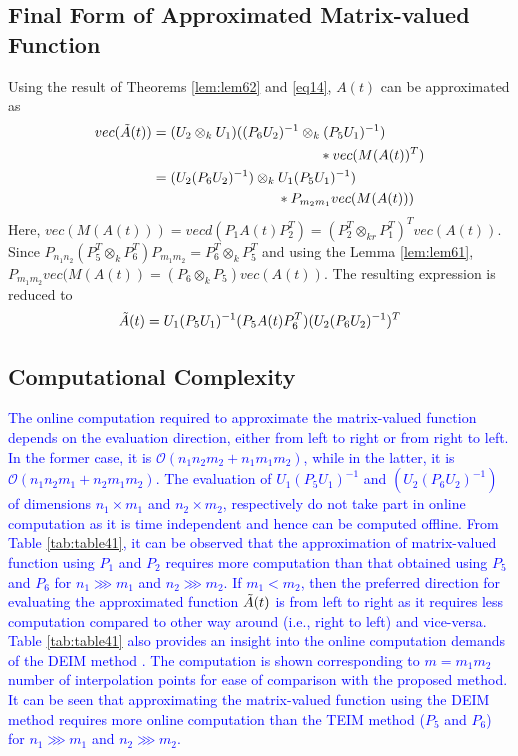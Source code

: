 \documentclass{article}
\begin{document}
\subsection{Final Form of Approximated Matrix-valued Function}
Using the result of Theorems \ref{lem:lem62} and \eqref{eq14}, $A(t)$ can be approximated as
\begin{equation*}
\begin{split}
     vec(\Tilde{A}(t))&= (U_2 \otimes_k U_1)((P_6U_2)^{-1} \otimes_k (P_5U_1)^{-1})\\
                       &\quad \quad \quad\quad \quad \quad\quad \quad \quad\quad \quad \quad*vec(M(A(t))^T)\\
                     &=(U_2(P_6U_2)^{-1})\otimes_k U_1(P_5U_1)^{-1})\\
                     &\quad \quad \quad\quad \quad \quad\quad \quad \quad *P_{m_2m_1}vec(M(A(t)))
\end{split}
\end{equation*}
Here, $vec(M(A(t)))=vecd(P_1A(t)P_2^T)=(P_2^T \otimes_{kr} P_1^T)^Tvec(A(t))$. Since $P_{n_1n_2}(P_5^T \otimes_{k}P_6^T)P_{m_1m_2}= P_6^T\otimes_{k}P_5^T$ and using the Lemma \ref{lem:lem61}, $P_{m_1m_2}vec(M(A(t))=(P_6 \otimes_k P_5)vec(A(t))$. The resulting expression is reduced to  
\begin{equation}\label{eq416}
    \Tilde{A}(t)=U_1(P_5U_1)^{-1}(P_5A(t)P_6^T)(U_2(P_6U_2)^{-1})^T
\end{equation}
\subsection{Computational Complexity}\label{sec:ComputationalComplexity}
\textcolor{blue}{The online computation required to approximate the matrix-valued function depends on the evaluation direction, either from left to right or from right to left. In the former case, it is $\mathcal{O}(n_1n_2m_2+n_1m_1m_2)$, while in the latter, it is $\mathcal{O}(n_1n_2m_1+n_2m_1m_2)$. The evaluation of $U_1(P_5U_1)^{-1}$ and $(U_2(P_6U_2)^{-1})$ of dimensions  $n_1\times m_1$ and $n_2 \times m_2$, respectively do not take part in online computation as it is time independent and hence can be computed offline. From Table \ref{tab:table41}, it can be observed that the approximation of matrix-valued function using $P_1$ and $P_2$ requires more computation than that obtained using $P_5$ and $P_6$ for $n_1 \ggg m_1$ and $n_2 \ggg m_2$. If $m_1<m_2$, then the preferred direction for evaluating the approximated function $\Tilde{A}(t)$ is from left to right as it requires less computation compared to other way around (i.e., right to left) and vice-versa. Table \ref{tab:table41} also provides an insight into the online computation demands of the DEIM method \cite{DEIM}. The computation is shown corresponding to $m=m_1m_2$ number of interpolation points for ease of comparison with the proposed method. It can be seen that approximating the matrix-valued function using the DEIM method requires more online computation than the TEIM method ($P_5$ and $P_6$) for $n_1 \ggg m_1$ and $n_2 \ggg m_2$.}
\end{document}
